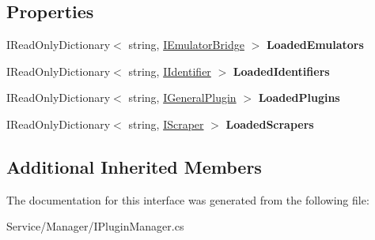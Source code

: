 \subsection*{Properties}
\begin{DoxyCompactItemize}
\item 
\hypertarget{interface_snowflake_1_1_service_1_1_manager_1_1_i_plugin_manager_a0289061b9332b8fc82aadc61438c3149}{}I\+Read\+Only\+Dictionary$<$ string, \hyperlink{interface_snowflake_1_1_emulator_1_1_i_emulator_bridge}{I\+Emulator\+Bridge} $>$ {\bfseries Loaded\+Emulators}\label{interface_snowflake_1_1_service_1_1_manager_1_1_i_plugin_manager_a0289061b9332b8fc82aadc61438c3149}

\item 
\hypertarget{interface_snowflake_1_1_service_1_1_manager_1_1_i_plugin_manager_a01aab2cca52df8cd34162458b6cbd276}{}I\+Read\+Only\+Dictionary$<$ string, \hyperlink{interface_snowflake_1_1_identifier_1_1_i_identifier}{I\+Identifier} $>$ {\bfseries Loaded\+Identifiers}\label{interface_snowflake_1_1_service_1_1_manager_1_1_i_plugin_manager_a01aab2cca52df8cd34162458b6cbd276}

\item 
\hypertarget{interface_snowflake_1_1_service_1_1_manager_1_1_i_plugin_manager_a13b43ef53ea5bd28b624884f4e19db5d}{}I\+Read\+Only\+Dictionary$<$ string, \hyperlink{interface_snowflake_1_1_plugin_1_1_i_general_plugin}{I\+General\+Plugin} $>$ {\bfseries Loaded\+Plugins}\label{interface_snowflake_1_1_service_1_1_manager_1_1_i_plugin_manager_a13b43ef53ea5bd28b624884f4e19db5d}

\item 
\hypertarget{interface_snowflake_1_1_service_1_1_manager_1_1_i_plugin_manager_a94bad112601b36f9c9b54c556d870490}{}I\+Read\+Only\+Dictionary$<$ string, \hyperlink{interface_snowflake_1_1_scraper_1_1_i_scraper}{I\+Scraper} $>$ {\bfseries Loaded\+Scrapers}\label{interface_snowflake_1_1_service_1_1_manager_1_1_i_plugin_manager_a94bad112601b36f9c9b54c556d870490}

\end{DoxyCompactItemize}
\subsection*{Additional Inherited Members}


The documentation for this interface was generated from the following file\+:\begin{DoxyCompactItemize}
\item 
Service/\+Manager/I\+Plugin\+Manager.\+cs\end{DoxyCompactItemize}
